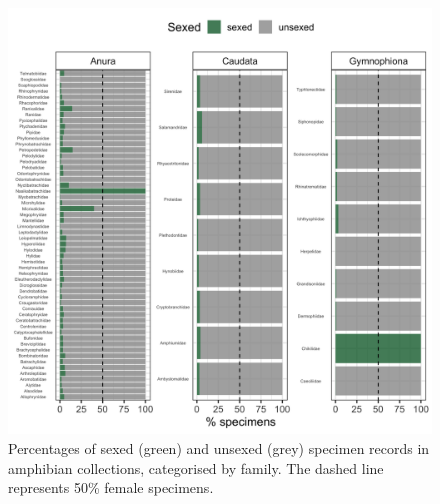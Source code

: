 \documentclass[a4paper, 12pt]{article}
\begin{document}
\begin{figure}[H]
 \centering
  \includegraphics[width = \linewidth]{figures/all-unsexed-family-amphibians.png}
  \caption{Percentages of sexed (green) and unsexed (grey) specimen records in amphibian collections, categorised by family.
  The dashed line represents 50\% female specimens.}
  \label{fig-amphibian-family-unsexed}
\end{figure}

\newpage
\end{document}
